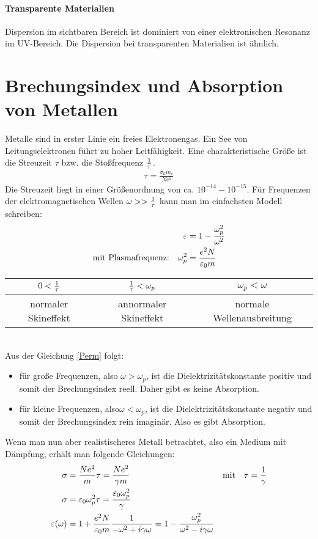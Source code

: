 \paragraph{Transparente Materialien} Dispersion im sichtbaren Bereich ist dominiert  von einer elektronischen Resonanz im UV-Bereich. Die Dispersion bei transparenten Materialien ist ähnlich.

\section{Brechungsindex und Absorption von Metallen}
Metalle sind in erster Linie ein freies Elektronengas. Ein See von Leitungselektronen führt zu hoher Leitfähigkeit. Eine charakteristische Größe ist die Streuzeit $\tau$ bzw. die Stoßfrequenz $\frac{1}{\tau}$.
\begin{align*}
	\tau=\frac{\sigma_0m_e}{N e^2}
\end{align*}
Die Streuzeit liegt in einer Größenordnung von ca. $10^{-14}-10^{-15}$. Für Frequenzen der elektromagnetischen Wellen $\omega>>\frac{1}{\tau}$ kann man im einfachsten Modell schreiben:
\begin{align}
	\varepsilon&=1-\frac{\omega_p^2}{\omega^2} \label{Perm}\\
	\text{mit Plasmafrequenz:}\quad\omega_p^2&=\frac{e^2N}{\varepsilon_0 m}\nonumber
\end{align}
\begin{tabular}{c|c|c}
	$0<\frac{1}{\tau}$&$\frac{1}{\tau}<\omega_p$&$\omega_p<\omega$\\
	\midrule
	normaler Skineffekt&annormaler Skineffekt&normale Wellenausbreitung
\end{tabular}
\\
Aus der Gleichung \ref{Perm} folgt:
\begin{itemize}
	\item für große Frequenzen, also $\omega>\omega_p$, ist die Dielektrizitätskonstante positiv und somit der Brechungsindex reell. Daher gibt es keine Absorption.
	\item für kleine Frequenzen, also$\omega<\omega_p$, ist die Dielektrizitätskonstante negativ und somit der Brechungsindex rein imaginär. Also es gibt Absorption.
\end{itemize}
Wenn man nun aber realistischeres Metall betrachtet, also ein Medium mit Dämpfung, erhält man folgende Gleichungen:
\begin{align*}
	\sigma&=\frac{Ne^2}{m}\tau=\frac{Ne^2}{\gamma m}&\text{mit}\quad \tau=\frac{1}{\gamma}\\
	\sigma&=\varepsilon_0\omega_p^2\tau=\frac{\varepsilon_0\omega_p^2}{\gamma}\\
	\varepsilon(\omega)&=1+\frac{e^2N}{\varepsilon_0 m}\frac{1}{-\omega^2+i\gamma\omega}=1-\frac{\omega_p^2}{\omega^2-i\gamma\omega}
\end{align*}
